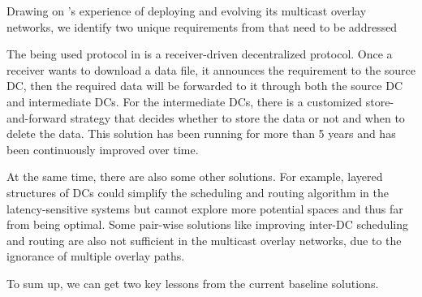 Drawing on \company's experience of deploying and evolving its multicast
overlay networks, we identify two unique requirements from  that need to be addressed


The being used protocol in \company is a receiver-driven decentralized protocol. Once a receiver wants to download a data file, it announces the requirement to the source DC, then the required data will be forwarded to it through both the source DC and intermediate DCs. For the intermediate DCs, there is a customized store-and-forward strategy that decides whether to store the data or not and when to delete the data. This solution has been running for more than 5 years and has been continuously improved over time.

At the same time, there are also some other solutions. For example, layered structures of DCs \cite{??} could simplify the scheduling and routing algorithm in the latency-sensitive systems but cannot explore more potential spaces and thus far from being optimal. Some pair-wise solutions like \cite{b4,bwe} improving inter-DC scheduling and routing are also not sufficient in the multicast overlay networks, due to the ignorance of multiple overlay paths.

To sum up, we can get two key lessons from the current baseline solutions.


